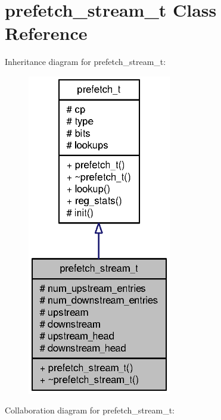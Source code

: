 \section{prefetch\_\-stream\_\-t Class Reference}
\label{classprefetch__stream__t}
Inheritance diagram for prefetch\_\-stream\_\-t:\nopagebreak
\begin{figure}[H]
\begin{center}
\leavevmode
\includegraphics[width=178pt]{classprefetch__stream__t__inherit__graph}
\end{center}
\end{figure}
Collaboration diagram for prefetch\_\-stream\_\-t:\nopagebreak
